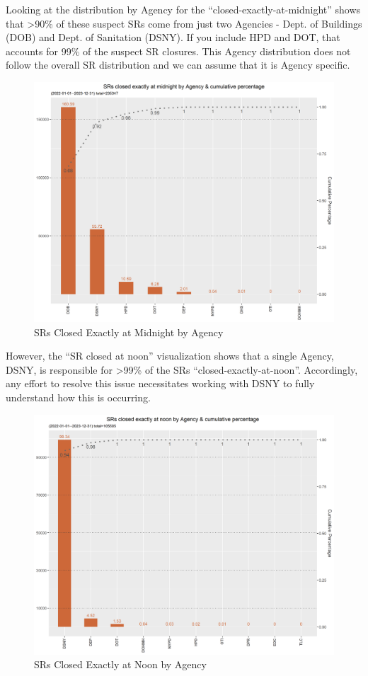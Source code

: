 \documentclass[12pt, titlepage]{article}
\begin{document}
{	Looking at the distribution by Agency for the ``closed-exactly-at-midnight'' shows that \textgreater{}90\% of these suspect SRs come from just two Agencies - Dept. of 
	Buildings (DOB) and Dept. of Sanitation (DSNY). If you include HPD and DOT, that accounts for 99\% of the suspect SR closures. This Agency
	distribution does not follow the overall SR distribution and we can assume that it is Agency specific. 

	\begin{figure}[H]
		 \centering
		 \includegraphics[width = \textwidth]{closed_at_midnight_chart.png}
		 \caption{SRs Closed Exactly at Midnight by Agency}
		 \label{fig:midnight-closed}
	\end{figure}	

	However, the ``SR closed at noon'' visualization shows that  a single Agency, DSNY,
	is responsible for \textgreater{}99\% of the SRs ``closed-exactly-at-noon''. Accordingly, any effort to resolve this issue
	necessitates working with DSNY to fully understand how this is occurring. 
	
	\begin{figure}[H]
		 \centering
		 \includegraphics[width = \textwidth]{closed_at_noon_chart.png}
		 \caption{SRs Closed Exactly at Noon by Agency}
		 \label{fig:noon-closed}
	\end{figure}	
	
}
\end{document}
